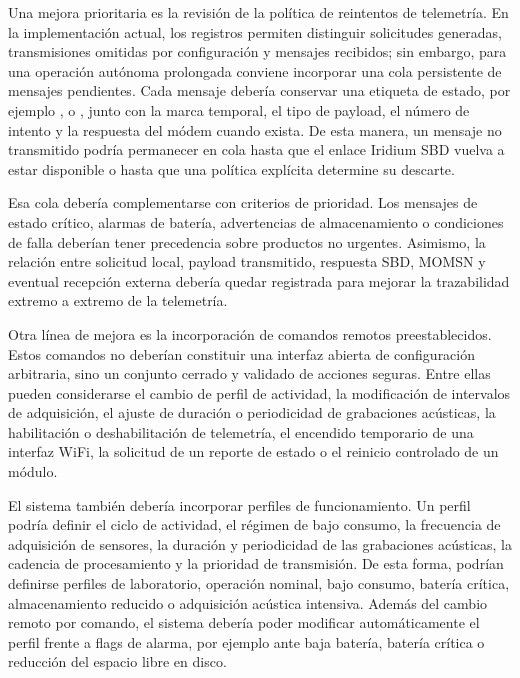 Una mejora prioritaria es la revisión de la política de reintentos de telemetría. En la implementación actual, los registros permiten distinguir solicitudes generadas, transmisiones omitidas por configuración y mensajes recibidos; sin embargo, para una operación autónoma prolongada conviene incorporar una cola persistente de mensajes pendientes. Cada mensaje debería conservar una etiqueta de estado, por ejemplo \texttt{}, \texttt{} o \texttt{}, junto con la marca temporal, el tipo de payload, el número de intento y la respuesta del módem cuando exista. De esta manera, un mensaje no transmitido podría permanecer en cola hasta que el enlace Iridium SBD vuelva a estar disponible o hasta que una política explícita determine su descarte.

Esa cola debería complementarse con criterios de prioridad. Los mensajes de estado crítico, alarmas de batería, advertencias de almacenamiento o condiciones de falla deberían tener precedencia sobre productos no urgentes. Asimismo, la relación entre solicitud local, payload transmitido, respuesta SBD, MOMSN y eventual recepción externa debería quedar registrada para mejorar la trazabilidad extremo a extremo de la telemetría.

Otra línea de mejora es la incorporación de comandos remotos preestablecidos. Estos comandos no deberían constituir una interfaz abierta de configuración arbitraria, sino un conjunto cerrado y validado de acciones seguras. Entre ellas pueden considerarse el cambio de perfil de actividad, la modificación de intervalos de adquisición, el ajuste de duración o periodicidad de grabaciones acústicas, la habilitación o deshabilitación de telemetría, el encendido temporario de una interfaz WiFi, la solicitud de un reporte de estado o el reinicio controlado de un módulo.

El sistema también debería incorporar perfiles de funcionamiento. Un perfil podría definir el ciclo de actividad, el régimen de bajo consumo, la frecuencia de adquisición de sensores, la duración y periodicidad de las grabaciones acústicas, la cadencia de procesamiento y la prioridad de transmisión. De esta forma, podrían definirse perfiles de laboratorio, operación nominal, bajo consumo, batería crítica, almacenamiento reducido o adquisición acústica intensiva. Además del cambio remoto por comando, el sistema debería poder modificar automáticamente el perfil frente a flags de alarma, por ejemplo ante baja batería, batería crítica o reducción del espacio libre en disco.


